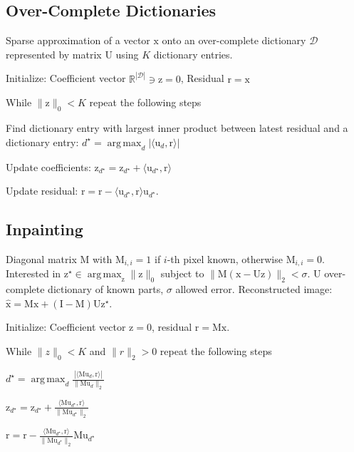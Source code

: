 \documentclass[a4paper, 11pt, landscape]{article}
\newcommand{\matr}[1]{\boldsymbol{\mathrm{#1}}}
\DeclareMathOperator*{\argmax}{arg\,max}
\begin{document}
\begin{multicols*}{3}
\subsection{Over-Complete Dictionaries}
Sparse approximation of a vector $\matr{x}$ onto an over-complete dictionary $\mathcal{D}$ represented by matrix $\matr{U}$ using $K$ dictionary entries.
\begin{compactenum}
	\item Initialize: Coefficient vector $\mathbb{R}^{|\mathcal{D}|} \ni \matr{z} = \matr{0}$, Residual $\matr{r} = \matr{x}$
	\item While $\|\matr{z}\|_0 < K$ repeat the following steps
	\item Find dictionary entry with largest inner product between latest residual and a dictionary entry: $d^\star = \argmax_d |\langle \matr{u}_d, \matr{r} \rangle|$
	\item Update coefficients: $\matr{z}_{d^\star} = \matr{z}_{d^\star} + \langle \matr{u}_{d^\star}, \matr{r} \rangle$
	\item Update residual: $\matr{r} = \matr{r} - \langle \matr{u}_{d^\star}, \matr{r} \rangle \matr{u}_{d^\star}$.
\end{compactenum}

\subsection{Inpainting}
Diagonal matrix $\matr{M}$ with $\matr{M}_{i, i} = 1$ if $i$-th pixel known, otherwise $\matr{M}_{i,i} = 0$. Interested in $\matr{z}^\star \in \argmax_{\matr{z}} \|\matr{z}\|_0$ subject to $\|\matr{M}(\matr{x} - \matr{Uz})\|_2 < \sigma$. $\matr{U}$ over-complete dictionary of known parts, $\sigma$ allowed error. Reconstructed image: $\hat{\matr{x}} = \matr{Mx} + (\matr{I} - \matr{M})\matr{U} \matr{z}^\star$.
\begin{compactenum}
	\item Initialize: Coefficient vector $\matr{z} = \matr{0}$, residual $\matr{r} = \matr{M}\matr{x}$.
	\item While $\|z\|_0 < K$ and $\|r\|_2 > 0$ repeat the following steps
	\item $d^\star = \argmax_d \frac{|\langle \matr{M}\matr{u}_d, \matr{r}\rangle|}{\|\matr{M}\matr{u}_d\|_2}$
	\item $\matr{z}_{d^\star} = \matr{z}_{d^\star} + \frac{\langle \matr{M}\matr{u}_{d^\star}, \matr{r} \rangle}{\|\matr{M}\matr{u}_{d^\star}\|_2}$
	\item $\matr{r} = \matr{r} - \frac{\langle \matr{M}\matr{u}_{d^\star}, \matr{r} \rangle}{\|\matr{M}\matr{u}_{d^\star}\|_2} \matr{M}\matr{u}_{d^\star}$
\end{compactenum}



\end{multicols*}
\end{document}
